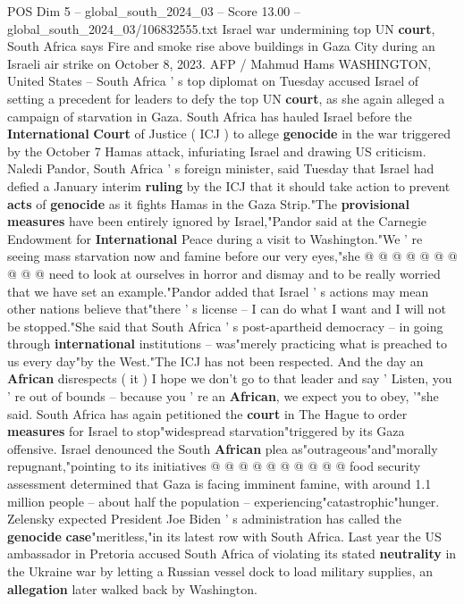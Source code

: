 \begin{textsample}{POS Dim 5 – global\_south\_2024\_03 – Score 13.00 – global\_south\_2024\_03/106832555.txt}  \label{ex:f5_pos_145}
Israel war undermining top UN \textbf{court}, South Africa says Fire and smoke rise above buildings in Gaza City during an Israeli air strike on October 8, 2023.
AFP / Mahmud Hams WASHINGTON, United States -- South Africa ' s top diplomat on Tuesday accused Israel of setting a precedent for leaders to defy the top UN \textbf{court}, as she again alleged a campaign of starvation in Gaza.
South Africa has hauled Israel before the \textbf{International} \textbf{Court} of Justice ( ICJ ) to allege \textbf{genocide} in the war triggered by the October 7 Hamas attack, infuriating Israel and drawing US criticism.
Naledi Pandor, South Africa ' s foreign minister, said Tuesday that Israel had defied a January interim \textbf{ruling} by the ICJ that it should take action to prevent \textbf{acts} of \textbf{genocide} as it fights Hamas in the Gaza Strip."The \textbf{provisional} \textbf{measures} have been entirely ignored by Israel,"Pandor said at the Carnegie Endowment for \textbf{International} Peace during a visit to Washington."We ' re seeing mass starvation now and famine before our very eyes,"she @ @ @ @ @ @ @ @ @ @ need to look at ourselves in horror and dismay and to be really worried that we have set an example."Pandor added that Israel ' s actions may mean other nations believe that"there ' s license -- I can do what I want and I will not be stopped."She said that South Africa ' s post-apartheid democracy -- in going through \textbf{international} institutions -- was"merely practicing what is preached to us every day"by the West."The ICJ has not been respected.
And the day an \textbf{African} disrespects ( it ) I hope we don't go to that leader and say ' Listen, you ' re out of bounds -- because you ' re an \textbf{African}, we expect you to obey, '"she said.
South Africa has again petitioned the \textbf{court} in The Hague to order \textbf{measures} for Israel to stop"widespread starvation"triggered by its Gaza offensive.
Israel denounced the South \textbf{African} plea as"outrageous"and"morally repugnant,"pointing to its initiatives @ @ @ @ @ @ @ @ @ @ food security assessment determined that Gaza is facing imminent famine, with around 1.1 million people -- about half the population -- experiencing"catastrophic"hunger.
Zelensky expected President Joe Biden ' s administration has called the \textbf{genocide} \textbf{case}"meritless,"in its latest row with South Africa.
Last year the US ambassador in Pretoria accused South Africa of violating its stated \textbf{neutrality} in the Ukraine war by letting a Russian vessel dock to load military supplies, an \textbf{allegation} later walked back by Washington.

\end{textsample}
